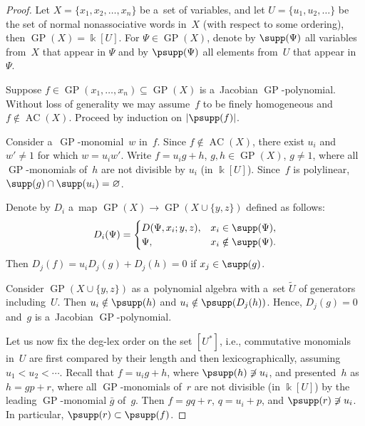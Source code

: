 \begin{proof}
Let $X=\{x_1,x_2,\dots, x_n \}$ be a~set of variables, and let $U=\{u_1,u_2,\dots \}$ be the set of normal
nonassociative words in~$X$ (with respect to some ordering), then $\operatorname{GP}(X) = \Bbbk[U]$.
For $\Psi \in \operatorname{GP}(X)$, denote by $\supp(\Psi)$ all variables from~$X$ that appear in $\Psi $ and by
$\psupp(\Psi)$ all elements from~$U$ that appear in~$\Psi $.

Suppose $f\in \operatorname{GP}(x_1,\dots, x_n)\subseteq \operatorname{GP}(X)$ is a~Jacobian $\operatorname{GP}$-polynomial.
Without loss of generality we may assume~$f$ to be f\/inely homogeneous and $f\notin \operatorname{AC}(X)$.
Proceed by induction on $|\psupp(f)|$.

Consider a~$\operatorname{GP}$-monomial~$w$ in~$f$.
Since $f\not\in \operatorname{AC}(X)$, there exist $u_i$ and $w'\neq 1$ for which $w = u_iw'$.
Write $f = u_ig + h$, $g,h\in \operatorname{GP}(X)$, $g\ne 1$, where all $\operatorname{GP}$-monomials of~$h$ are not divisible by $u_i$ (in $\Bbbk[U]$).
Since~$f$ is polylinear, $\supp(g) \cap \supp(u_i) = \varnothing$.

Denote by $D_i$ a~map $ \operatorname{GP}(X) \to \operatorname{GP}(X\cup \{y,z\})$ def\/ined as follows:
\begin{gather*}
D_i(\Psi) =
\begin{cases}
D(\Psi, x_i; y,z), & x_i\in \supp (\Psi),
\\
\Psi, & x_i\notin \supp (\Psi).
\end{cases}
\end{gather*}
Then $D_j(f) = u_iD_j(g) + D_j(h) = 0$ if $x_j \in \supp(g)$.

Consider $\operatorname{GP}(X\cup \{y,z\})$ as a~polynomial algebra with a~set $\widetilde U$ of generators including~$U$.
Then $u_i\notin \psupp(h)$ and $u_i\notin \psupp(D_j(h))$.
Hence, $D_j(g) = 0$ and~$g$ is a~Jacobian $\operatorname{GP}$-polynomial.

Let us now f\/ix the deg-lex order on the set $[U^*]$, i.e., commutative monomials in~$U$ are f\/irst compared by their
length and then lexicographically, assuming $u_1<u_2<\cdots $.
Recall that $f=u_ig+h$, where $\psupp(h)\not\ni u_i$, and presented~$h$ as $h=gp +r$, where all $\operatorname{GP}$-monomials
of~$r$ are not divisible (in $\Bbbk[U]$) by the leading $\operatorname{GP}$-monomial $\bar g$ of~$g$.
Then $f = gq + r$, $q = u_i + p$, and $\psupp(r)\not\ni u_i$.
In particular, $\psupp(r)\subset \psupp (f)$.


\end{proof}
